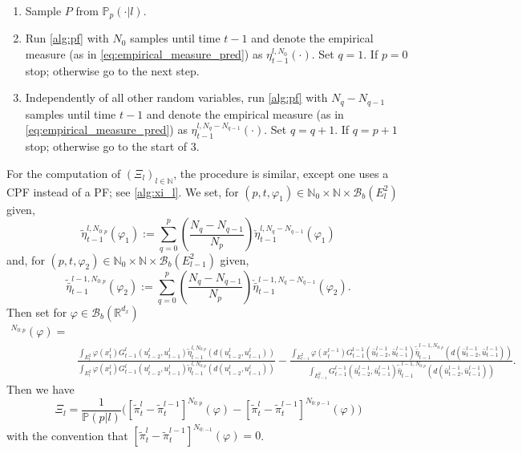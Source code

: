 \documentclass[english]{article}
\begin{document}
\begin{algorithm}[h!]
\begin{enumerate}
\item{Sample $P$ from $\mathbb{P}_p(\cdot|l)$.}
\item{Run \autoref{alg:pf} with $N_0$ samples until time $t-1$ and denote the empirical measure (as in \eqref{eq:empirical_measure_pred}) as $\eta_{t-1}^{l,N_0}(\cdot)$. Set $q=1$. If $p=0$ stop; otherwise go to the next step.}
\item{Independently of all other random variables, run \autoref{alg:pf} with $N_q-N_{q-1}$ samples until time $t-1$ and denote the empirical measure (as in \eqref{eq:empirical_measure_pred}) as $\eta_{t-1}^{l,N_q-N_{q-1}}(\cdot)$. Set
$q=q+1$. If $q=p+1$ stop; otherwise go to the start of 3.}
\end{enumerate}
\caption{Computing $\Xi_0$. Throughout $(t,l)\in\mathbb{N}\times\mathbb{N}_0$ are given.}
\label{alg:xi_0}
\end{algorithm}

For the computation of $(\Xi_l)_{l\in\mathbb{N}}$, the procedure is similar, except one uses a CPF instead of a PF; see \autoref{alg:xi_l}. We set, for $(p,t,\varphi_1)\in\mathbb{N}_0\times\mathbb{N}\times\mathcal{B}_b(E_l^2)$ given,
$$
\widetilde{\eta}_{t-1}^{l,N_{0:p}}(\varphi_1) := \sum_{q=0}^p \left(\frac{N_q-N_{q-1}}{N_p}\right)\check{\eta}_{t-1}^{l,N_q-N_{q-1}}(\varphi_1)
$$
and, for $(p,t,\varphi_2)\in\mathbb{N}_0\times\mathbb{N}\times\mathcal{B}_b(E_{l-1}^2)$ given,
$$
\widetilde{\bar{\eta}}_{t-1}^{l-1,N_{0:p}}(\varphi_2) := \sum_{q=0}^p \left(\frac{N_q-N_{q-1}}{N_p}\right)\check{\bar{\eta}}_{t-1}^{l-1,N_q-N_{q-1}}(\varphi_2).
$$
Then set for $\varphi\in\mathcal{B}_b(\mathbb{R}^{d_x})$
\begin{align*}
[\widetilde{\pi}_t^{l}&-\widetilde{\pi}_t^{l-1}]^{N_{0:p}}(\varphi)=\\
&\frac{ \int_{E_{l}^2} \varphi(x_t^l)G_{t-1}^l(u_{t-2}^l,u_{t-1}^l)\widetilde{\eta}_{t-1}^{l,N_{0:p}}\left(d(u_{t-2}^l,u_{t-1}^l)\right) }
{\int_{E_{l}^2} \varphi(x_t^l)G_{t-1}^l(u_{t-2}^l,u_{t-1}^l)\widetilde{\eta}_{t-1}^{l,N_{0:p}}\left(d(u_{t-2}^l,u_{t-1}^l)\right)} -
\frac{\int_{E_{l-1}^2} \varphi(x_t^{l-1})G_{t-1}^{l-1}(\bar{u}_{t-2}^{l-1},\bar{u}_{t-1}^{l-1})\widetilde{\bar{\eta}}_{t-1}^{l-1,N_{0:p}}\left(d(\bar{u}_{t-2}^{l-1},\bar{u}_{t-1}^{l-1})\right)}
{\int_{E_{l-1}^2} G_{t-1}^{l-1}(\bar{u}_{t-2}^{l-1},\bar{u}_{t-1}^{l-1})\widetilde{\bar{\eta}}_{t-1}^{l-1,N_{0:p}}\left(d(\bar{u}_{t-2}^{l-1},\bar{u}_{t-1}^{l-1})\right)}.
\end{align*}
Then we have
\begin{equation}\label{eq:xi_l}
\Xi_l = \frac{1}{\mathbb{P}(p|l)}\Big([\widetilde{\pi}_t^{l}-\widetilde{\pi}_t^{l-1}]^{N_{0:p}}(\varphi)-[\widetilde{\pi}_t^{l}-\widetilde{\pi}_t^{l-1}]^{N_{0:p-1}}(\varphi)\Big)
\end{equation}
with the convention that $[\widetilde{\pi}_t^{l}-\widetilde{\pi}_t^{l-1}]^{N_{0:-1}}(\varphi)=0$.
\end{document}

